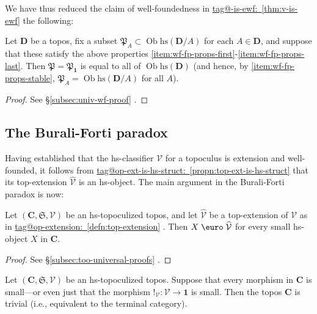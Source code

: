 \documentclass{amsart}
\makeatletter
\newcommand\bC{\mathbf{C}}
\newcommand\bD{\mathbf{D}}
\newcommand\cV{\mathcal{V}}
\newcommand\Ein{\mathrel{\text{\textup{\euro}}}}
\newcommand\fP{\mathfrak{P}}
\newcommand\fS{\mathfrak{S}}
\newcommand\hs{\mathrm{hs}}
\newcommand\Ob{\operatorname{Ob}}
\newcommand\tm{\mathbf{1}}
\newcommand\unex{{!}}
\newcommand\wh[1]{\widehat{#1}}
\newcommand\tagword[1]{\csname tag@#1\endcsname}
\def\label@tag#1:#2\@nil{#1}
\newcommand\labeltag[1]{\label@tag#1:\@nil}
\newcommand\jref[1]{%
  \texorpdfstring%
    {\hyperref[#1]{\tagword{\labeltag{#1}}~\ref*{#1}}}%
    {\tagword{\labeltag{#1}}~\ref*{#1}}%
}
\newcommand\prerefpost[3]{%
  \texorpdfstring%
    {\hyperref[#2]{#1\ref*{#2}#3}}%
    {#1\ref*{#2}#3}%
}
\newcommand\sref[1]{\prerefpost{\S}{#1}{}}
\theoremstyle{definition}
\theoremstyle{remark}
\theoremstyle{plainwithref}
\makeatother
\begin{document}
We have thus reduced the claim of well-foundedness in \jref{thm:v-is-ewf} the following:
\begin{propn} \label{propn:univ-wf}
  Let \( \bD \) be a topos, fix a subset \( \fP_A \subset \Ob \hs(\bD / A) \) for each \( A \in \bD \), and suppose that these satisfy the above properties \ref{item:wf-fp-props-first}-\ref{item:wf-fp-props-last}.
  Then \( \fP = \fP_\tm \) is equal to all of \( \Ob \hs(\bD) \) (and hence, by \ref{item:wf-fp-props-stable}, \( \fP_A = \Ob \hs(\bD / A) \) for all \( A \)).
\end{propn}
\begin{proof}
  See \sref{subsec:univ-wf-proof}.
\end{proof}

\subsection{The Burali-Forti paradox} \label{subsec:burali-forti}
Having established that the hs-classifier \( \cV \) for a topoculus is extension and well-founded, it follows from \jref{propn:top-ext-is-hs-struct} that its top-extension \( \wh \cV \) is an hs-object.
The main argument in the Burali-Forti paradox is now:

\begin{propn} \label{propn:too-universal}
  Let \( (\bC, \fS, \cV) \) be an hs-topoculized topos, and let \( \wh \cV \) be a top-extension of \( \cV \) as in \jref{defn:top-extension}.
  Then \( X \Ein \wh \cV \) for every small hs-object \( X \) in \( \bC \).
\end{propn}

\begin{proof}
 See \sref{subsec:too-universal-proofs}.
\end{proof}

\begin{thm}\label{thm:world-explodes}
  Let \( (\bC, \fS, \cV) \) be an hs-topoculized topos.
  Suppose that every morphism in \( \bC \) is small---or even just that the morphism \( \unex_\cV \colon \cV \to \tm \) is small.
  Then the topos \( \bC \) is trivial (i.e., equivalent to the terminal category).
\end{thm}
\end{document}
